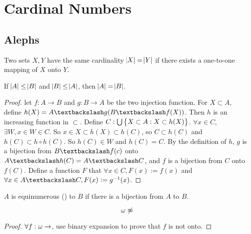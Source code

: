 \section{Cardinal Numbers}

\subsection{Alephs}

\begin{definition}
    Two sets $X,Y$ have the same cardinality $\abs{X} = \abs{Y}$ if there exists a one-to-one mapping of $X$ onto $Y$.
\end{definition}

\begin{theorem}
    If $\abs{A} \leq \abs{B}$ and $\abs{B} \leq \abs{A}$, then $\abs{A} = \abs{B}$.
\end{theorem}
\begin{proof}
    let $f: A \rightarrow B$ and $g : B \rightarrow A$ be the two injection function. For $X \subset A$, define $h(X) = A \textbackslash g (B \textbackslash f(X)) $. Then $h$ is an increasing function in $\subset$. Define $C: \bigcup \set{X\subset A: X \subset h(X)}$. $\forall x \in C$, $\exists W, x \in W \in C$. So $x \in X \subset{h(X)} \subset h(C)$, so $C \subset h(C)$ and $h(C) \subset h \circ h (C)$. So $h(C) \in W$ and $h(C) = C$. By the definition of $h$, $g$ is a bijection from $B \textbackslash f(c)$ onto $A \textbackslash h(C) = A \textbackslash C$, and $f$ is a bijection from $C$ onto $f(C)$. Define a function $F$ that $\forall x \in C, F(x) := f(x)$ and $\forall x \in A \textbackslash C, F(x) := g^{-1}(x)$.
\end{proof}


\begin{definition}
    $A$ is equinumerous (\cindex{$\approx$}) to $B$ if there is a bijection from $A$ to $B$.
\end{definition}

\begin{theorem}
    \begin{equation}
        \omega \not\approx \real
    \end{equation}
\end{theorem}
\begin{proof}
    $\forall f:\omega \rightarrow \real$, use binary expansion to prove that $f$ is not onto.
\end{proof}


